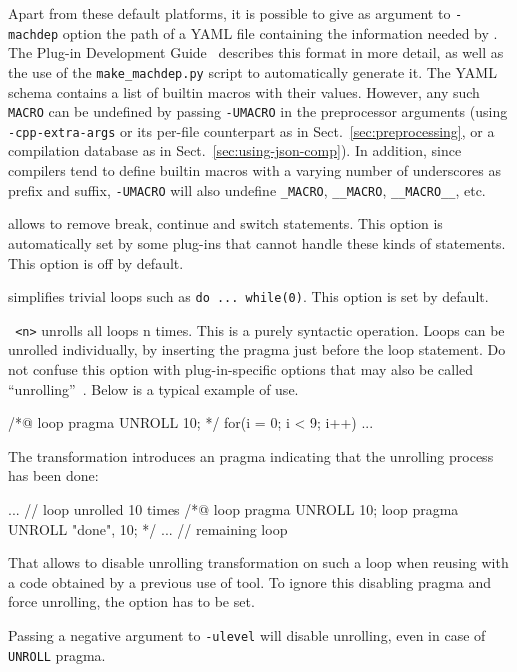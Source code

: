 \begin{description}
Apart from these default platforms, it is possible to give as argument
to \texttt{-machdep} option the path of a YAML file containing the information
needed by \FramaC. The Plug-in Development Guide~\cite{plugin-dev-guide} describes
this format in more detail, as well as the use of the \texttt{make\_machdep.py}
script to automatically generate it. The YAML schema contains a list of builtin
macros with their values. However, any such \texttt{MACRO} can be undefined by passing
\texttt{-UMACRO} in the preprocessor arguments
(using \texttt{-cpp-extra-args} or its per-file counterpart as in Sect.~\ref{sec:preprocessing},
or a compilation database as in Sect.~\ref{sec:using-json-comp}). In addition,
since compilers tend to define builtin macros with a varying number of
underscores as prefix and suffix, \texttt{-UMACRO} will also undefine
\texttt{\_MACRO}, \texttt{\_\_MACRO}, \texttt{\_\_MACRO\_\_}, etc.

\item {} allows \FramaC to remove break, continue and
  switch statements. This option is automatically set by some plug-ins that
  cannot handle these kinds of statements. This option is off by default.

\item {} simplifies trivial loops such as
  \texttt{do ... while(0)}. This option is set by default.

\item \texttt{ <n>} unrolls all loops n times. This is a
  purely syntactic operation.  Loops can be unrolled individually, by
  inserting the  pragma just before the loop statement. Do
  not confuse this option with plug-in-specific options that may also be called
  ``unrolling''~\cite{value}. Below is a typical example of use.
\begin{ccode}
/*@ loop pragma UNROLL 10; */
for(i = 0; i < 9; i++) ...
\end{ccode}
The transformation introduces an  pragma indicating that the unrolling process has been done:
\begin{ccode}
... // loop unrolled 10 times
/*@ loop pragma UNROLL 10;
    loop pragma UNROLL "done", 10; */
  ... // remaining loop
\end{ccode}
That allows to disable unrolling transformation on such a loop when reusing \FramaC with a code obtained by a previous use of \FramaC tool.
To ignore this disabling  pragma and force unrolling, the option \texttt{} has to be set.

Passing a negative argument to \texttt{-ulevel} will disable unrolling, even
in case of \texttt{UNROLL} pragma.
\end{description}

